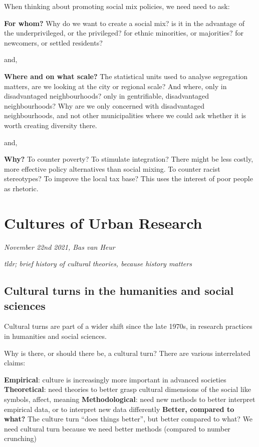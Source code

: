 \documentclass{article}
\begin{document}
When thinking about promoting social mix policies, we need need to ask:

\textbf{For whom?}
Why do we want to create a social mix? is it in the advantage of the underprivileged, or the privileged? for ethnic minorities, or majorities? for newcomers, or settled residents?

and, 

\textbf{Where and on what scale?}
The statistical units used to analyse segregation matters, are we looking at the city or regional scale? And where, only in disadvantaged neighbourhoods? only in gentrifiable, disadvantaged neighbourhoods? 
Why are we only concerned with disadvantaged neighbourhoods, and not other municipalities where we could ask whether it is worth creating diversity there.

and,

\textbf{Why?}
To counter poverty? To stimulate integration? There might be less costly, more effective policy alternatives than social mixing.
To counter racist stereotypes? To improve the local tax base? This uses the interest of poor people as rhetoric.


\section{Cultures of Urban Research}
\textit{November 22nd 2021, Bas van Heur}

\textit{tldr; brief history of cultural theories, because history matters}

\subsection{Cultural turns in the humanities and social sciences}

Cultural turns are part of a wider shift since the late 1970s, in research practices in humanities and social sciences.

Why is there, or should there be, a cultural turn? There are various interrelated claims:

\begin{outline}
	\1 \textbf{Empirical}: culture is increasingly more important in advanced societies
	\1 \textbf{Theoretical}: need theories to better grasp cultural dimensions of the social like symbols, affect, meaning
	\1 \textbf{Methodological}: need new methods to better interpret empirical data, or to interpret new data differently
	\1 \textbf{Better, compared to what?} The culture turn ``does things better'', but better compared to what? We need cultural turn because we need better methods (compared to number crunching)
\end{outline}
\end{document}
